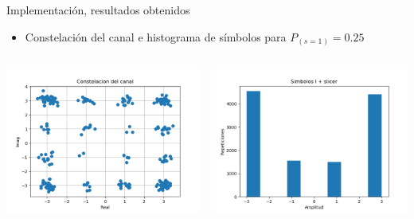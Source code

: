 \documentclass[xcolor=table]{beamer}
\begin{document}
\begin{frame}{Implementación, resultados obtenidos}
     \begin{itemize}
        \item Constelación del canal e histograma de símbolos para $P_{(s=1)}=0.25$
    \end{itemize}
\begin{columns}
    \begin{column}{0.48\paperwidth}
    \includegraphics[width=\textwidth]{Graficos/Channel_Constelation_3.png}%
    \end{column}
    \begin{column}{0.48\paperwidth}  
    \includegraphics[width=\textwidth]{Graficos/I_symbols_slicer_3.png}
    \end{column}
\end{columns}
\end{frame}
\end{document}
